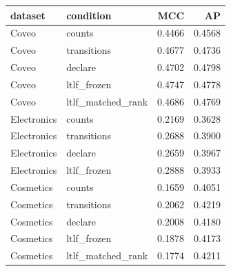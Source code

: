 \begin{tabular}{llrr}
\toprule
dataset & condition & MCC & AP \\
\midrule
Coveo & counts & 0.4466 & 0.4568 \\
Coveo & transitions & 0.4677 & 0.4736 \\
Coveo & declare & 0.4702 & 0.4798 \\
Coveo & ltlf\_frozen & 0.4747 & 0.4778 \\
Coveo & ltlf\_matched\_rank & 0.4686 & 0.4769 \\
Electronics & counts & 0.2169 & 0.3628 \\
Electronics & transitions & 0.2688 & 0.3900 \\
Electronics & declare & 0.2659 & 0.3967 \\
Electronics & ltlf\_frozen & 0.2888 & 0.3933 \\
Cosmetics & counts & 0.1659 & 0.4051 \\
Cosmetics & transitions & 0.2062 & 0.4219 \\
Cosmetics & declare & 0.2008 & 0.4180 \\
Cosmetics & ltlf\_frozen & 0.1878 & 0.4173 \\
Cosmetics & ltlf\_matched\_rank & 0.1774 & 0.4211 \\
\bottomrule
\end{tabular}
